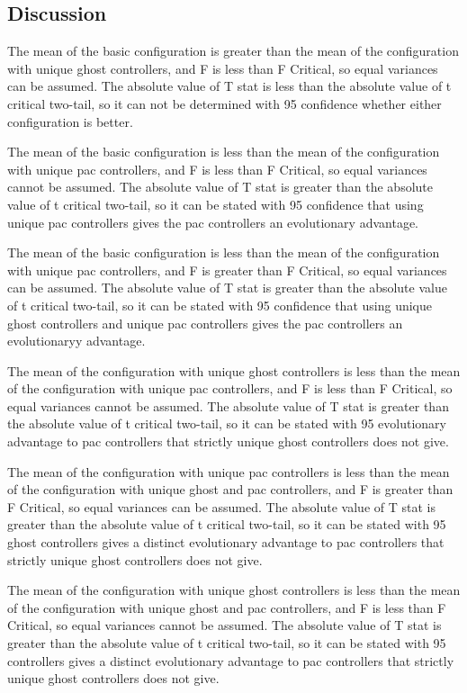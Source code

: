 \documentclass{article}
\newcommand\tab[1][1cm]{\hspace*{#1}}
\begin{document}
\subsection{Discussion}
\begin{flushleft}
\tab
The mean of the basic configuration is greater than the mean of the
configuration with unique ghost controllers, and F is less than F Critical,
so equal variances can be assumed. The absolute value of T stat is less than the
 absolute value of t critical two-tail, so it can not be determined with 95%
 confidence whether either configuration is better.

\tab
The mean of the basic configuration is less than the mean of the
 configuration with unique pac controllers, and F is less than F Critical,
 so equal variances cannot be assumed. The absolute value of T stat is greater
 than the absolute value of t critical two-tail, so it can be stated with 95%
 confidence that using unique pac controllers gives the pac controllers an
 evolutionary advantage.

\tab
The mean of the basic configuration is less than the mean of the
 configuration with unique pac controllers, and F is greater than F Critical,
 so equal variances can be assumed. The absolute value of T stat is greater
 than the absolute value of t critical two-tail, so it can be stated with 95%
 confidence that using unique ghost controllers and unique pac controllers gives
 the pac controllers an evolutionaryy advantage.

\tab
The mean of the configuration with unique ghost controllers is less than the
 mean of the configuration with unique pac controllers, and F is less than F
 Critical, so equal variances cannot be assumed. The absolute value of T stat is
 greater than the absolute value of t critical two-tail, so it can be stated
 with 95%
 evolutionary advantage to pac controllers that strictly unique ghost
 controllers does not give.

\tab
The mean of the configuration with unique pac controllers is less than the mean
 of the configuration with unique ghost and pac controllers, and F is greater
 than F Critical, so equal variances can be assumed. The absolute value of T
 stat is greater than the absolute value of t critical two-tail, so it can be
 stated with 95%
 ghost controllers gives a distinct evolutionary advantage to pac controllers
 that strictly unique ghost controllers does not give.

\tab
The mean of the configuration with unique ghost controllers is less than the mean
 of the configuration with unique ghost and pac controllers, and F is less
 than F Critical, so equal variances cannot be assumed. The absolute value of T
 stat is greater than the absolute value of t critical two-tail, so it can be
 stated with 95%
 controllers gives a distinct evolutionary advantage to pac controllers that
 strictly unique ghost controllers does not give.
\end{flushleft}
\end{document}

